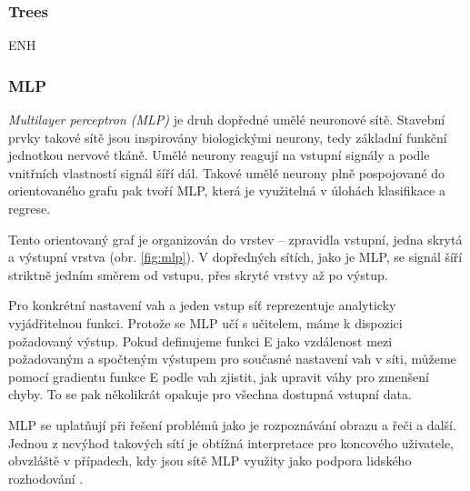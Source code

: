 \documentclass[thesis=M,czech]{FITthesis}[2012/06/26]
\begin{document}
  \subsubsection*{Trees}
   ENH
   
  \subsubsection*{MLP}
    \textit{Multilayer perceptron (MLP)} je druh dopředné umělé neuronové sítě.
Stavební prvky takové sítě jsou inspirovány biologickými neurony, tedy základní funkční jednotkou nervové tkáně. Umělé neurony reagují na vstupní signály a podle vnitřních vlastností signál šíří dál. Takové umělé neurony plně pospojované do orientovaného grafu pak tvoří MLP, která je využitelná v úlohách klasifikace a regrese. 

Tento orientovaný graf je organizován do vrstev -- zpravidla vstupní, jedna skrytá a výstupní vrstva (obr. \ref{fig:mlp}). V dopředných sítích, jako je MLP, se signál šíří striktně jedním směrem od vstupu, přes skryté vrstvy až po výstup. 

Pro konkrétní nastavení vah a jeden vstup síť reprezentuje analyticky vyjádřitelnou funkci. Protože se MLP učí s učitelem, máme k dispozici požadovaný výstup. Pokud definujeme funkci E jako vzdálenost mezi požadovaným a spočteným výstupem pro současné nastavení vah v síti, můžeme pomocí gradientu funkce E podle vah zjistit, jak upravit váhy pro zmenšení chyby. To se pak několikrát opakuje pro všechna dostupná vstupní data. 

MLP se uplatňují při řešení problémů jako je rozpoznávání obrazu a řeči a další. Jednou z nevýhod takových sítí je obtížná interpretace pro koncového uživatele, obvzláště v případech, kdy jsou sítě MLP využity jako podpora lidského rozhodování \cite{needed}. 

\end{document}
